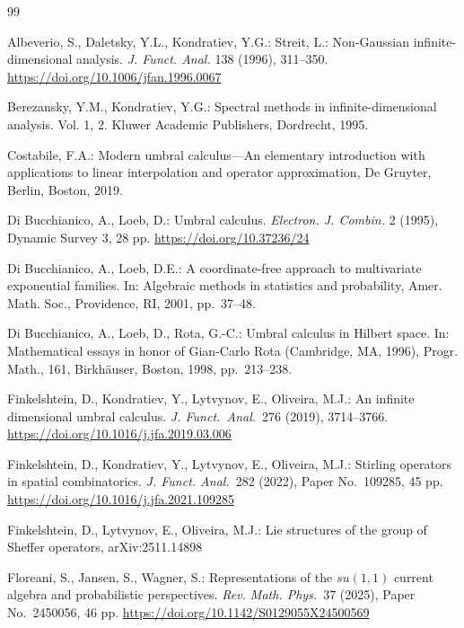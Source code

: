 \documentclass[12pt]{article}
\theoremstyle{remark}
\theoremstyle{remark}
\theoremstyle{remark}
\begin{document}
\begin{thebibliography}{99}

 Albeverio, S., Daletsky, Y.L., Kondratiev, Y.G.: Streit, L.:
Non-Gaussian infinite-dimensional analysis. {\it J. Funct. Anal.} 138 (1996), 311--350.\newline
\href{https://doi.org/10.1006/jfan.1996.0067}{https://doi.org/10.1006/jfan.1996.0067}   

  Berezansky, Y.M., Kondratiev, Y.G.: Spectral methods in infinite-dimensional analysis. Vol. 1, 2. Kluwer Academic Publishers, Dordrecht, 1995. 

  Costabile, F.A.: Modern umbral calculus---An elementary introduction with applications to linear interpolation and operator approximation, De Gruyter, Berlin, Boston, 2019.  

 Di Bucchianico, A., Loeb, D.: Umbral calculus. {\it Electron. J. Combin.} 2 (1995), Dynamic Survey 3, 28 pp.  \href{https://doi.org/10.37236/24}{https://doi.org/10.37236/24} 


  Di Bucchianico, A., Loeb, D.E.: A coordinate-free approach to multivariate exponential families. In: Algebraic methods in statistics and probability, Amer. Math. Soc., Providence, RI, 2001, pp.~37--48. 

 Di Bucchianico, A., Loeb, D.,   Rota, G.-C.:
Umbral calculus in Hilbert space. In: Mathematical essays in honor of Gian-Carlo Rota (Cambridge, MA, 1996),
Progr. Math., 161, Birkh\"auser, Boston,  1998, pp.~213--238. 
  
 



 Finkelshtein, D., Kondratiev, Y., Lytvynov, E., Oliveira, M.J.:
An infinite dimensional umbral calculus. {\it J. Funct.\ Anal.}\  276 (2019), 3714--3766. 
\href{https://doi.org/10.1016/j.jfa.2019.03.006}{https://doi.org/10.1016/j.jfa.2019.03.006} 
 

Finkelshtein, D.,  Kondratiev, Y., Lytvynov, E., Oliveira, M.J.: 
Stirling operators in spatial combinatorics. {\it J. Funct. Anal.}\ 282 (2022), Paper No.~109285, 45 pp. \href{https://doi.org/10.1016/j.jfa.2021.109285}{https://doi.org/10.1016/j.jfa.2021.109285}

 Finkelshtein, D.,   Lytvynov, E., Oliveira, M.J.:
Lie structures of the group of Sheffer operators, 	arXiv:2511.14898   

 Floreani, S., Jansen, S., Wagner, S.: Representations of the $su(1,1)$ current algebra and probabilistic perspectives. {\it Rev. Math. Phys.}\ 37 (2025), Paper No.~2450056, 46 pp. \href{https://doi.org/10.1142/S0129055X24500569}{https://doi.org/10.1142/S0129055X24500569} 


\end{thebibliography}
\end{document}
